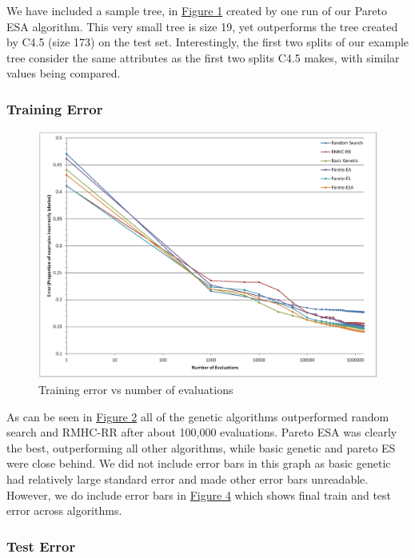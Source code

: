 \documentclass{acm_proc_article-sp}
\begin{document}
We have included a sample tree, in \hyperref[tree]{Figure 1} created by one run of our Pareto ESA algorithm. This very small tree is size 19, yet outperforms the tree created by C4.5 (size 173) on the test set. Interestingly, the first two splits of our example tree consider the same attributes as the first two splits C4.5 makes, with similar values being compared.

\subsubsection{Training Error}

\begin{figure}[h]
\centering
\includegraphics[width=\linewidth]{train_chart.eps}
\caption{Training error vs number of evaluations}\label{train}
\end{figure}

As can be seen in \hyperref[train]{Figure 2} all of the genetic algorithms outperformed random search and RMHC-RR after about 100,000 evaluations. Pareto ESA was clearly the best, outperforming all other algorithms, while basic genetic and pareto ES were close behind. We did not include error bars in this graph as basic genetic had relatively large standard error and made other error bars unreadable. However, we do include error bars in \hyperref[algorithms]{Figure 4} which shows final train and test error across algorithms.

\subsubsection{Test Error}
\end{document}
